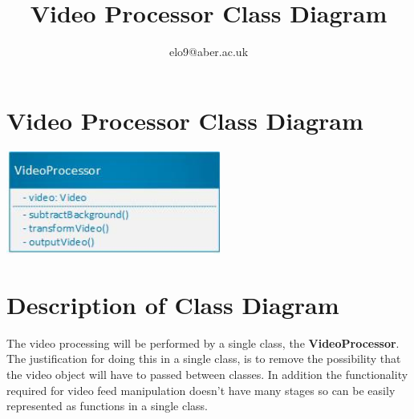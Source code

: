 \documentclass{article}
\title{Video Processor Class Diagram}
\author{elo9@aber.ac.uk}
\begin{document}
\maketitle
\tableofcontents

\newpage

\section{Video Processor Class Diagram}
\includegraphics[width=200pt]{VideoProcessorClassDiagramImage}


\section{Description of Class Diagram}
The video processing will be performed by a single class, the \textbf{VideoProcessor}. The justification for doing this in a single class, is to remove the possibility that the video object will have to passed between classes. In addition the functionality required for video feed manipulation doesn't have many stages so can be easily represented as functions in a single class.
\end{document}
